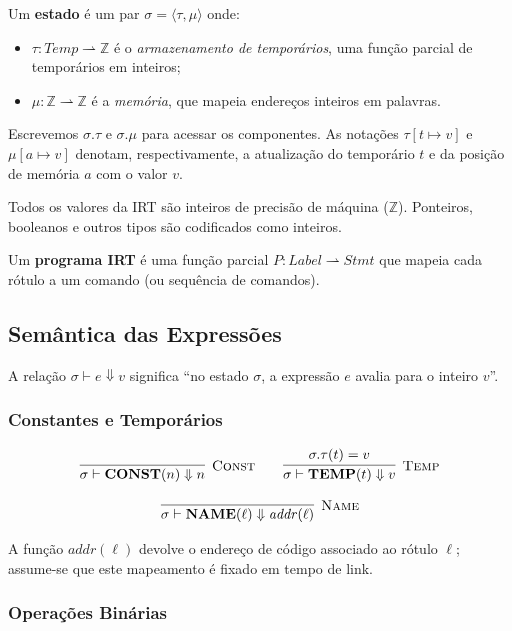 \begin{Definition}[Estado]\label{def:irt-state}
  Um \textbf{estado} é um par $\sigma = \langle \tau, \mu \rangle$ onde:
  \begin{itemize}
    \item $\tau : \mathit{Temp} \rightharpoonup \mathbb{Z}$ é o
      \emph{armazenamento de temporários}, uma função parcial de temporários
      em inteiros;
    \item $\mu : \mathbb{Z} \rightharpoonup \mathbb{Z}$ é a
      \emph{memória}, que mapeia endereços inteiros em palavras.
  \end{itemize}
  Escrevemos $\sigma.\tau$ e $\sigma.\mu$ para acessar os componentes.
  As notações $\tau[t \mapsto v]$ e $\mu[a \mapsto v]$ denotam,
  respectivamente, a atualização do temporário $t$ e da posição de memória $a$
  com o valor $v$.
\end{Definition}

Todos os valores da IRT são inteiros de precisão de máquina ($\mathbb{Z}$).
Ponteiros, booleanos e outros tipos são codificados como inteiros.

Um \textbf{programa IRT} é uma função parcial
$P : \mathit{Label} \rightharpoonup \mathit{Stmt}$
que mapeia cada rótulo a um comando (ou sequência de comandos).

\subsection{Semântica das Expressões}\label{sec:irt-expr-sem}

A relação $\sigma \vdash e \Downarrow v$ significa ``no estado $\sigma$, a
expressão $e$ avalia para o inteiro $v$''.

\subsubsection*{Constantes e Temporários}

\[
  \infer[\textsc{Const}]
  {\sigma \vdash \mathbf{CONST}(n) \Downarrow n}
  {}
  \qquad
  \infer[\textsc{Temp}]
  {\sigma \vdash \mathbf{TEMP}(t) \Downarrow v}
  {\sigma.\tau(t) = v}
\]

\[
  \infer[\textsc{Name}]
  {\sigma \vdash \mathbf{NAME}(\ell) \Downarrow \mathit{addr}(\ell)}
  {}
\]

A função $\mathit{addr}(\ell)$ devolve o endereço de código associado ao
rótulo $\ell$; assume-se que este mapeamento é fixado em tempo de link.

\subsubsection*{Operações Binárias}

